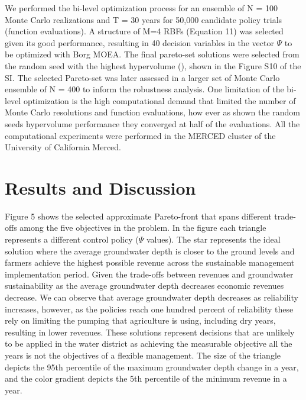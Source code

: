 \documentclass[11pt,a4paper]{article}
\begin{document}
We performed the bi-level optimization process for an ensemble of N = 100 Monte Carlo realizations and T = 30 years for 50,000 candidate policy trials (function evaluations). A structure of M=4 RBFs (Equation 11) was selected given its good performance, resulting in 40 decision variables in the vector $\Psi$ to be optimized with Borg MOEA. The final pareto-set solutions were selected from the random seed with the highest hypervolume (\cite{hadka_large-scale_2015,reed_evolutionary_2013}), shown in the Figure S10 of the SI. The selected Pareto-set was later assessed in a larger set of Monte Carlo ensemble of N = 400 to inform the robustness analysis. One limitation of the bi-level optimization is the high computational demand that limited the number of Monte Carlo resolutions and function evaluations, how ever as shown the random seeds hypervolume performance they converged at half of the evaluations. All the computational experiments were performed in the MERCED cluster of the University of California Merced. 


\section{Results and Discussion}

Figure 5 shows the selected approximate Pareto-front that spans different trade-offs among the five objectives in the problem. In the figure each triangle represents a different control policy ($\Psi$ values). The star represents the ideal solution where the average groundwater depth is closer to the ground levels and farmers achieve the highest possible revenue across the sustainable management implementation period. Given the trade-offs between revenues and groundwater sustainability as the average groundwater depth decreases economic revenues decrease. We can observe that average groundwater depth decreases as reliability increases, however, as the policies reach one hundred percent of reliability these rely on limiting the pumping that agriculture is using, including dry years, resulting in lower revenues. These solutions represent decisions that are unlikely to be applied in the water district as achieving the measurable objective all the years is not the objectives of a flexible management. The size of the triangle depicts the 95th percentile of the maximum groundwater depth change in a year, and the color gradient depicts the 5th percentile of the minimum revenue in a year. 
\end{document}
